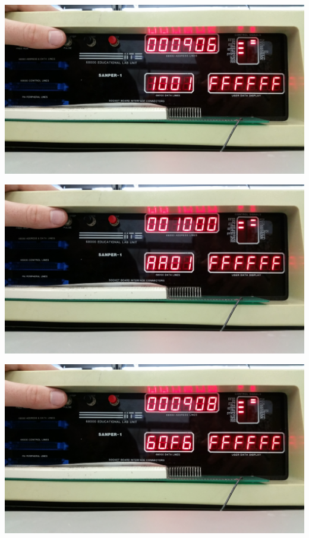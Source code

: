 \documentclass[12pt, twocolumn]{article}
\begin{document}
\begin{center}
\includegraphics[width=1\linewidth]{Lab1/20150120_094840}
\end{center}
\begin{center}
\includegraphics[width=1\linewidth]{Lab1/20150120_094841}
\end{center}
\begin{center}
\includegraphics[width=1\linewidth]{Lab1/20150120_094843}
\end{center}
\end{document}
